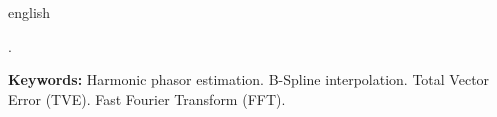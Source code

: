 \begin{otherlanguage*}{english}
\begin{resumo}
.

\textbf{Keywords:} Harmonic phasor estimation. B-Spline interpolation. Total Vector Error (TVE). Fast Fourier Transform (FFT).

\end{resumo}
\end{otherlanguage*}
